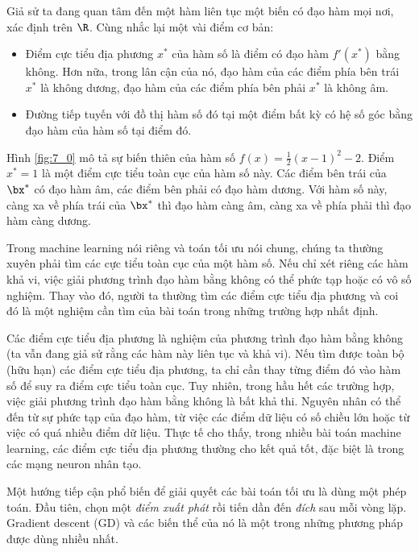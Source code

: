  
Giả sử ta đang quan tâm đến một hàm liên tục một biến có đạo hàm mọi nơi, xác
định trên $\R$. Cùng nhắc lại một vài điểm cơ bản:
\begin{itemize}
    \item Điểm cực tiểu địa phương $x^*$ của hàm số là điểm có đạo hàm $f'(x^*)$
    bằng không. Hơn nữa, trong lân cận của nó, đạo hàm của các điểm phía bên
    trái $x^*$ là không dương, đạo hàm của các điểm phía bên phải $x^*$ là không
    âm.

    \item Đường tiếp tuyến với đồ thị hàm số đó tại một điểm bất kỳ có hệ số góc
    bằng đạo hàm của hàm số tại điểm đó.
\end{itemize}
 
Hình \ref{fig:7_0} mô tả sự biến thiên của hàm số $f(x) = \frac{1}{2}(x - 1)^2 -
2$. Điểm $x^* = 1$ là một điểm cực tiểu toàn cục của hàm số này. Các điểm bên
trái của $\bx^*$ có đạo hàm âm, các điểm bên phải có đạo hàm dương. Với
hàm số này, càng xa về phía trái của $\bx^*$ thì đạo hàm càng âm, càng xa về
phía phải thì đạo hàm càng dương.
 
 
Trong machine learning nói riêng và toán tối ưu nói chung, chúng ta thường xuyên
phải tìm các cực tiểu toàn cục của một hàm số. Nếu chỉ xét riêng các hàm khả vi,
việc giải phương trình đạo hàm bằng không có thể phức tạp hoặc có vô số nghiệm.
Thay vào đó, người ta thường tìm các điểm cực tiểu địa phương và coi đó là một
nghiệm cần tìm của bài toán trong những trường hợp nhất định.

Các điểm cực tiểu địa phương là nghiệm của phương trình đạo hàm bằng không (ta
vẫn đang giả sử rằng các hàm này liên tục và khả vi). Nếu tìm được toàn bộ (hữu
hạn) các điểm cực tiểu địa phương, ta chỉ cần thay từng điểm đó vào hàm số để
suy ra điểm cực tiểu toàn cục. Tuy nhiên, trong hầu hết các trường hợp, việc
giải phương trình đạo hàm bằng không là bất khả thi. Nguyên nhân có thể đến từ
sự phức tạp của đạo hàm, từ việc các điểm dữ liệu có số chiều lớn hoặc từ việc
có quá nhiều điểm dữ liệu. Thực tế cho thấy, trong nhiều bài toán machine
learning, các điểm cực tiểu địa phương thường cho kết quả tốt, đặc biệt là
trong các mạng neuron nhân tạo.

Một hướng tiếp cận phổ biến để giải quyết các bài toán tối ưu là dùng một phép
toán. Đầu tiên, chọn một \textit{điểm xuất phát} rồi tiến dần đến \textit{đích}
sau mỗi vòng lặp. Gradient descent (GD) và các biến thể của nó là một trong
những phương pháp được dùng nhiều nhất.

